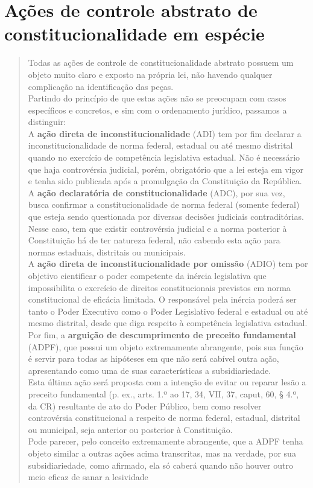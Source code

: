\documentclass{article}
\begin{document}
\section{Ações de controle abstrato de constitucionalidade em espécie}

\begin{quote}
    Todas as ações de controle de constitucionalidade abstrato possuem um objeto muito claro e exposto na própria lei, não havendo qualquer complicação na identificação das peças.\\
    Partindo do princípio de que estas ações não se preocupam com casos específicos e concretos, e sim com o ordenamento jurídico, passamos a distinguir:\\
    A \textbf{ação direta de inconstitucionalidade} (ADI) tem por fim declarar a inconstitucionalidade de norma federal, estadual ou até mesmo distrital quando no exercício de competência legislativa estadual. Não é necessário que haja controvérsia judicial, porém, obrigatório que a lei esteja em vigor e tenha sido publicada após a promulgação da Constituição da República.\\
    A \textbf{ação declaratória de constitucionalidade} (ADC), por sua vez, busca confirmar a constitucionalidade de norma federal (somente federal) que esteja sendo questionada por diversas decisões judiciais contraditórias. Nesse caso, tem que existir controvérsia judicial e a norma posterior à Constituição há de ter natureza federal, não cabendo esta ação para normas estaduais, distritais ou municipais.\\
    A \textbf{ação direta de inconstitucionalidade por omissão} (ADIO) tem por objetivo cientificar o poder competente da inércia legislativa que impossibilita o exercício de direitos constitucionais previstos em norma constitucional de eficácia limitada. O responsável pela inércia poderá ser tanto o Poder Executivo como o Poder Legislativo federal e estadual ou até mesmo distrital, desde que diga respeito à competência legislativa estadual.\\
    Por fim, a \textbf{arguição de descumprimento de preceito fundamental} (ADPF), que possui um objeto extremamente abrangente, pois sua função é servir para todas as hipóteses em que não será cabível outra ação, apresentando como uma de suas características a subsidiariedade.\\
    Esta última ação será proposta com a intenção de evitar ou reparar lesão a preceito fundamental (p. ex., arts. 1.º ao 17, 34, VII, 37, caput, 60, § 4.º, da CR) resultante de ato do Poder Público, bem como resolver controvérsia constitucional a respeito de norma federal, estadual, distrital ou municipal, seja anterior ou posterior à Constituição.\\
    Pode parecer, pelo conceito extremamente abrangente, que a ADPF tenha objeto similar a outras ações acima transcritas, mas na verdade, por sua subsidiariedade, como afirmado, ela só caberá quando não houver outro meio eficaz de sanar a lesividade \cite[n. p.]{padilha_oab_2015}
\end{quote}
\end{document}
